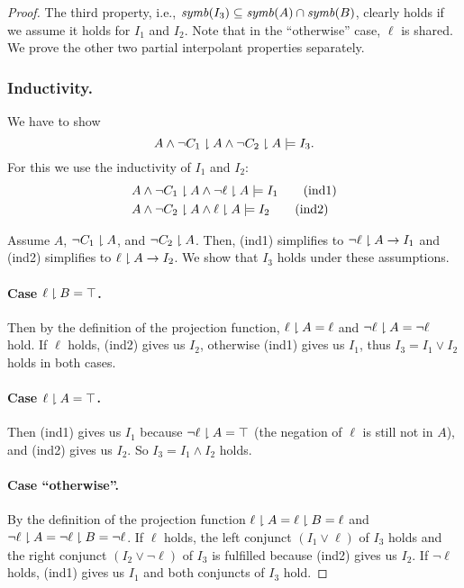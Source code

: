 \begin{techreport}
\begin{proof}
 The third property, i.e., $\mathop{\mathit{symb}}(I_3) \subseteq \mathop{\mathit{symb}}(A) \cap \mathop{\mathit{symb}}(B)$, 
 clearly holds
 if we assume it holds for $I_1$ and $I_2$. Note that in the
 ``otherwise'' case, $\ell$ is shared.
%
 We prove the other two partial interpolant properties separately.
 \subsubsection*{Inductivity.} We have to show
 \[A \land \lnot C_1\downharpoonright A \land \lnot C_2\downharpoonright A \models I_3.\]
 For this we use the inductivity of $I_1$
 and $I_2$:
 \begin{align*}
  & A \land \lnot C_1 \downharpoonright A \land \lnot \ell\downharpoonright A \models I_1 \tag{ind1} \\
  & A \land \lnot C_2 \downharpoonright A \land \ell\downharpoonright A \models I_2 \tag{ind2}
 \end{align*}  

 Assume $A$, $\lnot C_1\downharpoonright A$, and $\lnot C_2\downharpoonright A$. Then, (ind1)
 simplifies to $\lnot\ell \downharpoonright
 A \rightarrow I_1$ and (ind2) simplifies to $\ell \downharpoonright A \rightarrow I_2$.  We show that
 $I_3$ holds under these assumptions.

\paragraph{Case $\ell\downharpoonright B = \top$.}
 
 Then by the definition of the projection function, $\ell\downharpoonright A = \ell$ 
 and $\lnot \ell\downharpoonright A = \lnot \ell$ hold. If $\ell$ holds, (ind2) gives us
 $I_2$, otherwise (ind1) gives us $I_1$, thus $I_3 = I_1\lor I_2$ holds in both cases.
 
\paragraph{Case $\ell\downharpoonright A = \top$.}
 
 Then (ind1) gives us $I_1$ because $\lnot \ell\downharpoonright A = \top$ 
 (the negation of $\ell$ is still not in $A$), and (ind2) gives us $I_2$. 
 So $I_3 = I_1 \land I_2$ holds.
 
\paragraph{Case ``otherwise''.}
 
 By the definition of the projection function
 $\ell\downharpoonright A = \ell\downharpoonright B = \ell$ and 
 $\lnot \ell\downharpoonright A = \lnot \ell\downharpoonright B = \lnot \ell$. If $\ell$ holds,
 the left conjunct $(I_1 \lor \ell)$ of $I_3$ holds and the right
 conjunct $(I_2\lor \lnot\ell)$ of $I_3$ is fulfilled because (ind2) gives us $I_2$.
 If $\lnot \ell$ holds, (ind1) gives us $I_1$ and both conjuncts of $I_3$ hold.
 

\end{proof}
\end{techreport}
